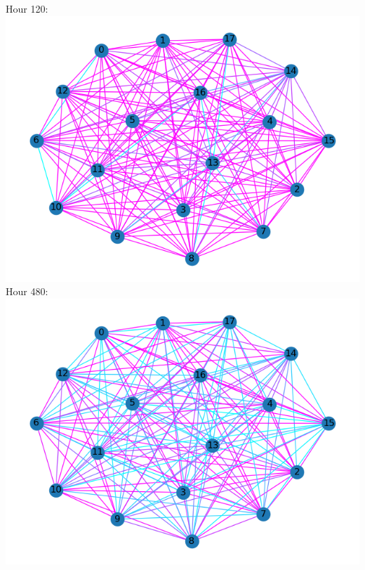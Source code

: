 \documentclass[11pt]{article}
\begin{document}
\begin{minipage}{0.3\textwidth}
Hour 120:\\
\includegraphics[scale=0.35]{../cor_images/p_830.png}\\
Hour 480:\\
\includegraphics[scale=0.35]{../cor_images/p_920.png}
\end{minipage}
\hfill
\end{document}
